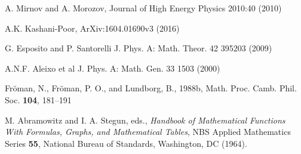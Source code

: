 \documentclass[atmp]{ipart_v1}
\begin{document}
\begin{thebibliography}{30}
 A. Mirnov and A. Morozov, Journal of High Energy Physics 2010:40 (2010)

 A.K. Kashani-Poor, ArXiv:1604.01690v3 (2016)

 G. Esposito and P. Santorelli J. Phys. A: Math. Theor. 42 395203 (2009)

 A.N.F. Aleixo et al J. Phys. A: Math. Gen. 33 1503 (2000)

 Fr\"oman, N., Fr\"oman, P. O., and Lundborg, B., 1988b, 
Math. Proc. Camb. Phil. Soc. \textbf{104}, 181–191

 M. Abramowitz and I. A. Stegun, eds., 
{\it Handbook of Mathematical Functions With Formulas, Graphs, and Mathematical Tables}, 
NBS Applied Mathematics Series \textbf{55}, National Bureau of Standards, Washington, DC (1964).

\end{thebibliography}
\end{document}
